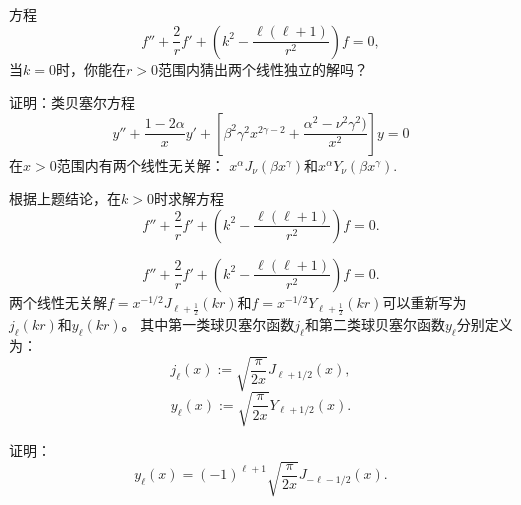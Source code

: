 \documentclass[CJK]{beamer}
\begin{document}
\begin{frame}
  \bch
  
  方程
  $$ f''+\frac{2}{r}f'+\left(k^2-\frac{\ell(\ell+1)}{r^2}\right) f = 0, $$
  当$k=0$时，你能在$r>0$范围内猜出两个线性独立的解吗？

  \ech
\end{frame}


\begin{frame}
  \bch
  
  证明：类贝塞尔方程
  $$ y''+\frac{1-2\alpha}{x} y' + \left[\beta^2\gamma^2x^{2\gamma-2}+\frac{\alpha^2-\nu^2\gamma^2)}{x^2}\right]y=0 $$
  在$x>0$范围内有两个线性无关解： $x^{\alpha}J_\nu(\beta x^\gamma)$和$x^{\alpha}Y_\nu(\beta x^\gamma)$.
  \ech
\end{frame}


\begin{frame}
  \bch

  根据上题结论，在$k>0$时求解方程
  $$ f''+\frac{2}{r}f'+\left(k^2-\frac{\ell(\ell+1)}{r^2}\right) f = 0. $$
  \ech
\end{frame}

\begin{frame}
  \bch
  $$ f''+\frac{2}{r}f'+\left(k^2-\frac{\ell(\ell+1)}{r^2}\right) f = 0. $$  
  两个线性无关解$f =  x^{-1/2}J_{\ell+\frac{1}{2}}(kr)$和$f=x^{-1/2}Y_{\ell+\frac{1}{2}}(kr)$可以重新写为$ j_\ell(kr)$和$y_{\ell}(kr)$。
  其中第一类球贝塞尔函数$j_\ell$和第二类球贝塞尔函数$y_\ell$分别定义为：{\blue
  $$ j_\ell(x) :=\sqrt{ \frac{\pi}{2x}} J_{\ell+1/2}(x), $$
  $$ y_\ell(x) :=\sqrt{ \frac{\pi}{2x}} Y_{\ell+1/2}(x). $$  }

  
  \ech
\end{frame}


\begin{frame}
  \bch
  \ech
\end{frame}


\begin{frame}
  \bch
  \ech
\end{frame}

\begin{frame}
  \bch
  
  证明：
  $$y_\ell(x) = (-1)^{\ell+1}\sqrt{\frac{\pi}{2x}}J_{-\ell-1/2}(x).$$
  \ech
\end{frame}
\end{document}
